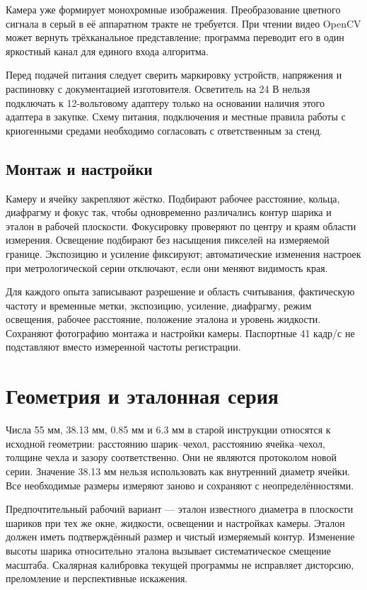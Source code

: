 \documentclass[12pt,a4paper]{article}
\begin{document}
Камера уже формирует монохромные изображения. Преобразование цветного сигнала в серый в её аппаратном тракте не требуется. При чтении видео OpenCV может вернуть трёхканальное представление; программа переводит его в один яркостный канал для единого входа алгоритма.

Перед подачей питания следует сверить маркировку устройств, напряжения и распиновку с документацией изготовителя. Осветитель на 24 В нельзя подключать к 12-вольтовому адаптеру только на основании наличия этого адаптера в закупке. Схему питания, подключения и местные правила работы с криогенными средами необходимо согласовать с ответственным за стенд.

\subsection{Монтаж и настройки}
Камеру и ячейку закрепляют жёстко. Подбирают рабочее расстояние, кольца, диафрагму и фокус так, чтобы одновременно различались контур шарика и эталон в рабочей плоскости. Фокусировку проверяют по центру и краям области измерения. Освещение подбирают без насыщения пикселей на измеряемой границе. Экспозицию и усиление фиксируют; автоматические изменения настроек при метрологической серии отключают, если они меняют видимость края.

Для каждого опыта записывают разрешение и область считывания, фактическую частоту и временные метки, экспозицию, усиление, диафрагму, режим освещения, рабочее расстояние, положение эталона и уровень жидкости. Сохраняют фотографию монтажа и настройки камеры. Паспортные 41 кадр/с не подставляют вместо измеренной частоты регистрации.

\section{Геометрия и эталонная серия}
Числа 55 мм, 38.13 мм, 0.85 мм и 6.3 мм в старой инструкции относятся к исходной геометрии: расстоянию шарик--чехол, расстоянию ячейка--чехол, толщине чехла и зазору соответственно. Они не являются протоколом новой серии. Значение 38.13 мм нельзя использовать как внутренний диаметр ячейки. Все необходимые размеры измеряют заново и сохраняют с неопределённостями.

Предпочтительный рабочий вариант --- эталон известного диаметра в плоскости шариков при тех же окне, жидкости, освещении и настройках камеры. Эталон должен иметь подтверждённый размер и чистый измеряемый контур. Изменение высоты шарика относительно эталона вызывает систематическое смещение масштаба. Скалярная калибровка текущей программы не исправляет дисторсию, преломление и перспективные искажения.
\end{document}
